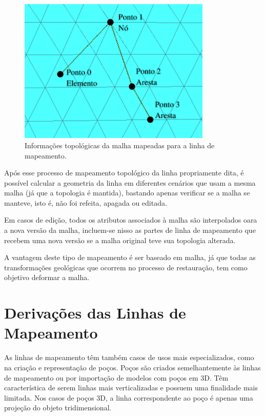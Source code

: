 \begin{figure} [hbt!]
  \begin{center}
    \includegraphics[width=260pt]{images/fig-lm-topo}
    \caption{Informações topológicas da malha mapeadas para a linha de mapeamento.}\label{fig-lm-topo}
  \end{center}
\end{figure}



Após esse processo de mapeamento topológico da linha propriamente dita, é possível calcular a geometria da linha em diferentes cenários que usam a mesma malha (já que a topologia é mantida), bastando apenas verificar se a malha se manteve, isto é, não foi refeita, apagada ou editada.

Em casos de edição, todos os atributos associados à malha são interpolados oara a nova versão da malha, incluem-se nisso as partes de linha de mapeamento que recebem uma nova versão se a malha original teve sua topologia alterada.

A vantagem deste tipo de mapeamento é ser baseado em malha, já que todas as transformações geológicas que ocorrem no processo de restauração, tem como objetivo deformar a malha.

\section{Derivações das Linhas de Mapeamento}

As linhas de mapeamento têm também casos de usos mais especializados, como na criação e representação de poços. Poços são criados semelhantemente às linhas de mapeamento ou por importação de modelos com poços em 3D. Têm característica de serem linhas mais verticalizadas e possuem uma finalidade mais limitada. Nos casos de poços 3D, a linha correspondente ao poço é apenas uma projeção do objeto tridimensional.


